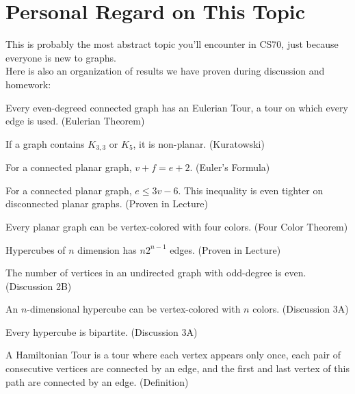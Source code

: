 \section{Personal Regard on This Topic}
This is probably the most abstract topic you'll encounter in CS70, just because everyone is new to graphs. \\
Here is also an organization of results we have proven during discussion and homework:
\begin{bindenum}
    \item Every even-degreed connected graph has an Eulerian Tour, a tour on which every edge is used. (Eulerian Theorem)
    \item If a graph contains $K_{3,3}$ or $K_5$, it is non-planar. (Kuratowski)
    \item For a connected planar graph, $v + f = e + 2$. (Euler's Formula)
    \item For a connected planar graph, $e \leq 3v - 6$. This inequality is even tighter on disconnected planar graphs. (Proven in Lecture)
    \item Every planar graph can be vertex-colored with four colors. (Four Color Theorem)
    \item Hypercubes of $n$ dimension has $n 2^{n - 1}$ edges. (Proven in Lecture)
    \item The number of vertices in an undirected graph with odd-degree is even. (Discussion 2B)
    \item An $n$-dimensional hypercube can be vertex-colored with $n$ colors. (Discussion 3A)
    \item Every hypercube is bipartite. (Discussion 3A)
    \item A Hamiltonian Tour is a tour where each vertex appears only once, each pair of consecutive vertices are connected by an edge, and the first and last vertex of this path are connected by an edge. (Definition)
\end{bindenum}
